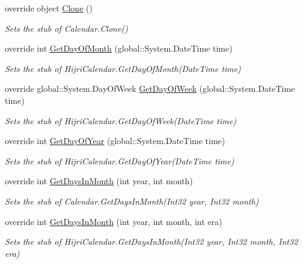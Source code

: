 \begin{DoxyCompactItemize}
override object \hyperlink{class_system_1_1_globalization_1_1_fakes_1_1_stub_hijri_calendar_a3bdff9d0f11c86ff13e197a9333a84bc}{Clone} ()
\begin{DoxyCompactList}\small\item\em Sets the stub of Calendar.\-Clone()\end{DoxyCompactList}\item 
override int \hyperlink{class_system_1_1_globalization_1_1_fakes_1_1_stub_hijri_calendar_a7c7f54352aa1c94a806d039668a482d7}{Get\-Day\-Of\-Month} (global\-::\-System.\-Date\-Time time)
\begin{DoxyCompactList}\small\item\em Sets the stub of Hijri\-Calendar.\-Get\-Day\-Of\-Month(\-Date\-Time time)\end{DoxyCompactList}\item 
override global\-::\-System.\-Day\-Of\-Week \hyperlink{class_system_1_1_globalization_1_1_fakes_1_1_stub_hijri_calendar_a7e103b03a82fda54317be1640d7d7fbb}{Get\-Day\-Of\-Week} (global\-::\-System.\-Date\-Time time)
\begin{DoxyCompactList}\small\item\em Sets the stub of Hijri\-Calendar.\-Get\-Day\-Of\-Week(\-Date\-Time time)\end{DoxyCompactList}\item 
override int \hyperlink{class_system_1_1_globalization_1_1_fakes_1_1_stub_hijri_calendar_a508422eaafc7013d505c70e558b37ffc}{Get\-Day\-Of\-Year} (global\-::\-System.\-Date\-Time time)
\begin{DoxyCompactList}\small\item\em Sets the stub of Hijri\-Calendar.\-Get\-Day\-Of\-Year(\-Date\-Time time)\end{DoxyCompactList}\item 
override int \hyperlink{class_system_1_1_globalization_1_1_fakes_1_1_stub_hijri_calendar_a00eb4ca28ad710560f364560f8a30373}{Get\-Days\-In\-Month} (int year, int month)
\begin{DoxyCompactList}\small\item\em Sets the stub of Calendar.\-Get\-Days\-In\-Month(\-Int32 year, Int32 month)\end{DoxyCompactList}\item 
override int \hyperlink{class_system_1_1_globalization_1_1_fakes_1_1_stub_hijri_calendar_aa544e89325ed044d414b1dbe4369f8ef}{Get\-Days\-In\-Month} (int year, int month, int era)
\begin{DoxyCompactList}\small\item\em Sets the stub of Hijri\-Calendar.\-Get\-Days\-In\-Month(\-Int32 year, Int32 month, Int32 era)\end{DoxyCompactList}\item 

\end{DoxyCompactItemize}

